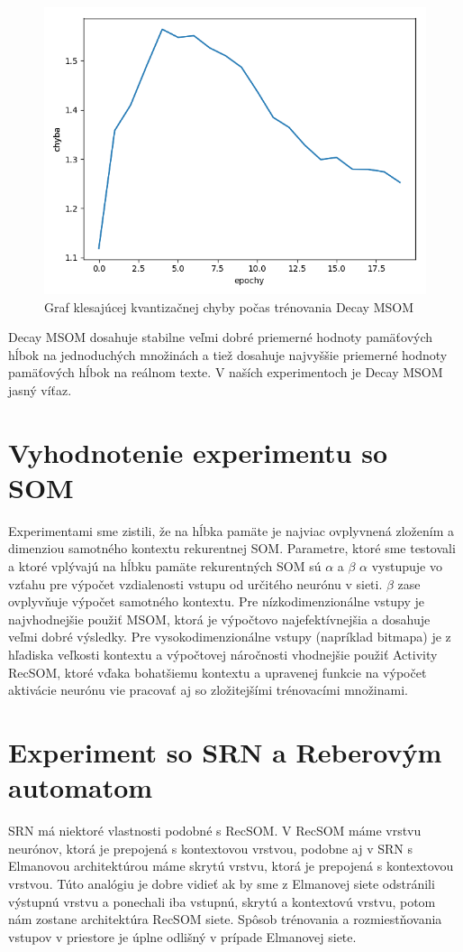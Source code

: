 \begin{figure}[H]
    \centering
    \includegraphics[width=\textwidth]{assets/dm_error_top}
    \caption{Graf klesajúcej kvantizačnej chyby počas trénovania Decay MSOM}
\end{figure}

Decay MSOM dosahuje stabilne veľmi dobré priemerné hodnoty pamäťových hĺbok na jednoduchých množinách a 
tiež dosahuje najvyššie priemerné hodnoty pamäťových hĺbok na reálnom texte.
V naších experimentoch je Decay MSOM jasný víťaz.

\section{ Vyhodnotenie experimentu so SOM}
Experimentami sme zistili, že na hĺbka pamäte je najviac ovplyvnená zložením a dimenziou samotného kontextu rekurentnej SOM.
Parametre, ktoré sme testovali a ktoré vplývajú na hĺbku pamäte rekurentných SOM sú $\alpha$ a $\beta$
$\alpha$ vystupuje vo vzťahu pre výpočet vzdialenosti vstupu od určitého neurónu v sieti.
$\beta$ zase ovplyvňuje výpočet samotného kontextu.
Pre nízkodimenzionálne vstupy je najvhodnejšie použiť MSOM, ktorá je výpočtovo najefektívnejšia a dosahuje veľmi dobré 
výsledky.
Pre vysokodimenzionálne vstupy (napríklad bitmapa) je z hľadiska veľkosti kontextu a výpočtovej náročnosti vhodnejšie použiť
Activity RecSOM, ktoré vďaka bohatšiemu kontextu a upravenej funkcie na výpočet aktivácie neurónu vie pracovať aj so zložitejšími trénovacími množinami.


\section{Experiment so SRN a Reberovým automatom}
SRN má niektoré vlastnosti podobné s RecSOM.
V RecSOM máme vrstvu neurónov, ktorá je prepojená s kontextovou vrstvou, podobne 
aj v SRN s Elmanovou architektúrou máme skrytú vrstvu, ktorá je prepojená s kontextovou vrstvou.
Túto analógiu je dobre vidieť ak by sme z Elmanovej siete odstránili výstupnú vrstvu a ponechali iba 
vstupnú, skrytú a kontextovú vrstvu, potom nám zostane architektúra RecSOM siete.
Spôsob trénovania a rozmiestňovania vstupov v priestore je úplne odlišný v prípade Elmanovej siete.

